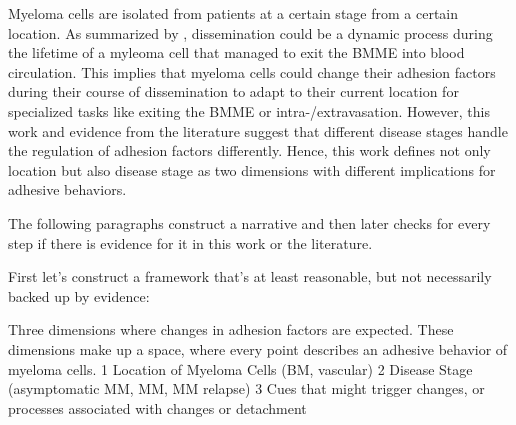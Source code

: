 














Myeloma cells are isolated from patients at a certain stage from a certain
location. As summarized by \citet{zeissigTumourDisseminationMultiple2020},
dissemination could be a dynamic process during the lifetime of a myleoma cell
that managed to exit the \ac{BMME} into blood circulation. This implies that
myeloma cells could change their adhesion factors during their course of
dissemination to adapt to their current location for specialized tasks like
exiting the \ac{BMME} or intra-/extravasation. However, this work and evidence
from the literature suggest that different disease stages handle the regulation
of adhesion factors differently. Hence, this work defines not only location but
also disease stage as two dimensions with different implications for adhesive
behaviors.


The following paragraphs construct a narrative and then later checks for every
step if there is evidence for it in this work or the literature.

First let's construct a framework that's at least reasonable, but not necessarily
backed up by evidence:

Three dimensions where changes in adhesion factors are expected. These dimensions
make up a space, where every point describes an adhesive behavior of myeloma cells.
1 Location of Myeloma Cells (BM, vascular)
2 Disease Stage (asymptomatic MM, MM, MM relapse)
3 Cues that might trigger changes, or processes associated with changes or detachment


